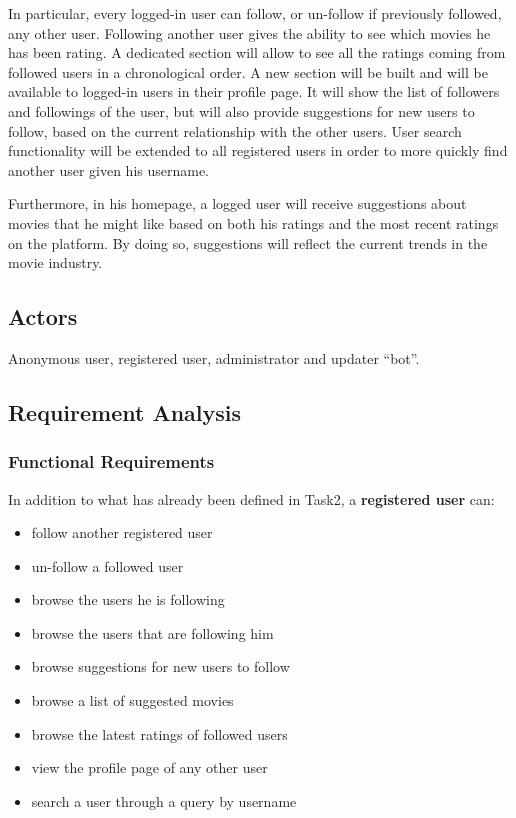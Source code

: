 \documentclass[11pt]{article}
\begin{document}
In particular, every logged-in user can follow, or un-follow if previously followed, any other user.
Following another user gives the ability to see which movies he has been rating.
A dedicated section will allow to see all the ratings coming from followed users in a chronological order.
A new section will be built and will be available to logged-in users in their profile page. It will show the list of followers and followings of the user, but will also provide suggestions for new users to follow, based on the current relationship with the other users.
User search functionality will be extended to all registered users in order to more quickly find another user given his username.

Furthermore, in his homepage, a logged user will receive suggestions about 
movies that he might like based on both his ratings and the most recent ratings on the platform. By doing so, suggestions will reflect the current trends in the movie industry.

\subsection{Actors}
Anonymous user, registered user, administrator and updater ``bot''.

\subsection{Requirement Analysis}

\subsubsection{Functional Requirements}
In addition to what has already been defined in Task2, a \textbf{registered user} can:
\begin{itemize}
	\item follow another registered user
	\item un-follow a followed user
	\item browse the users he is following
	\item browse the users that are following him
	\item browse suggestions for new users to follow
	\item browse a list of suggested movies
	\item browse the latest ratings of followed users
	\item view the profile page of any other user
	\item search a user through a query by username
\end{itemize}
\end{document}
